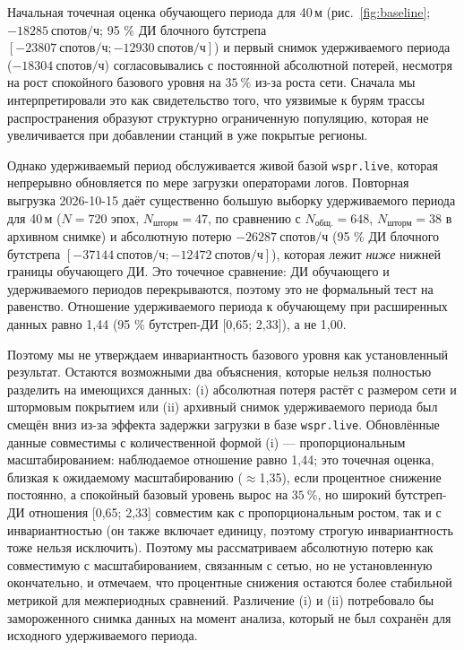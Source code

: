 \documentclass{agujournal2019}
\begin{document}
{\sloppy Начальная точечная оценка обучающего периода для 40\,м
(рис.~\ref{fig:baseline}; $\SI{-18285}{\mbox{спотов/ч}}$; 95 \% ДИ блочного
бутстрепа $[\SI{-23807}{\mbox{спотов/ч}}; \SI{-12930}{\mbox{спотов/ч}}]$) и первый
снимок удерживаемого периода ($\SI{-18304}{\mbox{спотов/ч}}$) согласовывались
с постоянной абсолютной потерей, несмотря на рост спокойного базового
уровня на $\SI{+35}{\percent}$ из-за роста сети. Сначала мы
интерпретировали это как свидетельство того, что уязвимые к бурям
трассы распространения образуют структурно ограниченную популяцию,
которая не увеличивается при добавлении станций в уже покрытые
регионы.\par}

Однако удерживаемый период обслуживается живой базой \texttt{wspr.live},
которая непрерывно обновляется по мере загрузки операторами логов. Повторная выгрузка 2026-10-15 даёт существенно большую
выборку удерживаемого периода для 40\,м ($N = 720$ эпох,
$N_{\mbox{шторм}} = 47$, по сравнению с $N_{\mbox{общ.}} = 648$,
$N_{\mbox{шторм}} = 38$ в архивном снимке) и абсолютную потерю
$\SI{-26287}{\mbox{спотов/ч}}$ (95 \% ДИ блочного бутстрепа
$[-\SI{37144}{\mbox{спотов/ч}}; -\SI{12472}{\mbox{спотов/ч}}]$), которая лежит
\emph{ниже} нижней границы обучающего ДИ. Это точечное сравнение:
ДИ обучающего и удерживаемого периодов перекрываются, поэтому это не формальный
тест на равенство. Отношение удерживаемого периода к обучающему при расширенных
данных равно 1,44 (95 \% бутстреп-ДИ [0,65; 2,33]), а не 1,00.

Поэтому мы не утверждаем инвариантность базового уровня как установленный
результат. Остаются возможными два объяснения, которые нельзя полностью
разделить на имеющихся данных: (i) абсолютная потеря растёт с размером
сети и штормовым покрытием или (ii) архивный снимок удерживаемого периода
был смещён вниз из-за эффекта задержки загрузки в базе
\texttt{wspr.live}. Обновлённые данные совместимы с количественной формой
(i) — пропорциональным масштабированием: наблюдаемое отношение равно
1,44; это точечная оценка, близкая к ожидаемому масштабированию
($\approx$1,35), если процентное снижение постоянно, а спокойный
базовый уровень вырос на $\SI{+35}{\percent}$, но широкий
бутстреп-ДИ отношения [0,65; 2,33] совместим как с пропорциональным
ростом, так и с инвариантностью (он также включает единицу, поэтому
строгую инвариантность тоже нельзя исключить). Поэтому мы рассматриваем абсолютную потерю как совместимую с масштабированием, связанным с сетью,
но не установленную окончательно, и отмечаем, что процентные снижения остаются более стабильной метрикой для межпериодных сравнений.
Различение (i) и (ii) потребовало бы замороженного снимка данных на момент
анализа, который не был сохранён для исходного удерживаемого периода.
\end{document}
